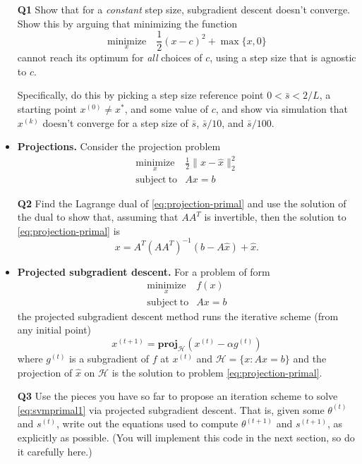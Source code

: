 \documentclass{article}
\newcommand{\minimize}[1]{\underset{#1}{\text{minimize}}}
\newcommand{\mH}{\mathcal H}
\newcommand{\proj}{\mathbf{proj}}
\newcommand{\subjto}{\mathrm{subject~to}}
\begin{document}
\begin{itemize}
\item[\textbf{Q1}] Show that for a \emph{constant} step size, subgradient descent doesn't converge. Show this by arguing that minimizing the function 
\[
\minimize{x} \quad \frac{1}{2}(x-c)^2 + \max\{x,0\} 
\]
cannot reach its optimum for \emph{all} choices of $c$, using a step size that is agnostic to $c$. 

Specifically, do this by picking a step size reference point $0 < \bar s < 2/L$, a starting point $x^{(0)} \neq x^*$, and some value of $c$, and show via simulation that $x^{(k)}$ doesn't converge for a step size of $\bar s$, $\bar s/10$, and $\bar s/100$. 





\item \textbf{Projections.} Consider the projection problem 
\begin{equation}
\begin{array}{ll}
\minimize{x} & \frac{1}{2}\|x-\hat x\|_2^2\\
\subjto & Ax = b
\end{array}
\label{eq:projection-primal}
\end{equation}
\item[\textbf{Q2}] Find the Lagrange dual of \eqref{eq:projection-primal} and use the solution of the dual to show that, assuming that $AA^T$ is invertible, then the solution to \eqref{eq:projection-primal} is 
\[
x = A^T(AA^T)^{-1} (b-A\hat x) + \hat x.
\]

\item \textbf{Projected subgradient descent.} For a problem of form 
\[
\begin{array}{ll}
\minimize{x} & f(x) \\
\subjto & Ax = b
\end{array}
\]
the projected subgradient descent method runs the iterative scheme (from any initial point)
\[
x^{(t+1)} = \proj_{\mH}(x^{(t)} - \alpha g^{(t)})
\]
where $g^{(t)}$ is a subgradient of $f$ at $x^{(t)}$ and 
$\mH = \{x : Ax = b\}$ and the projection of $\hat x$ on $\mH$ is the solution to problem \eqref{eq:projection-primal}.


\item[\textbf{Q3}] Use the pieces you have so far to propose an iteration scheme to solve \eqref{eq:svmprimal1} via projected subgradient descent. That is, given some $\theta^{(t)}$ and $s^{(t)}$, write out the equations used to compute $\theta^{(t+1)}$ and $s^{(t+1)}$, as explicitly as possible. (You will implement this code in the next section, so do it carefully here.)


\end{itemize}
\end{document}
